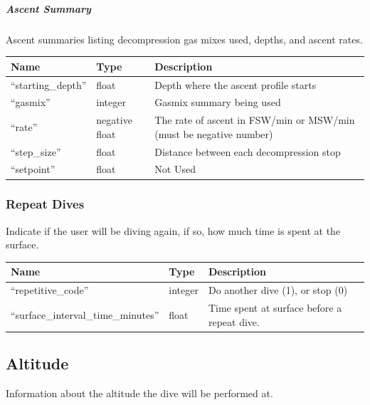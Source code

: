 \documentclass[12pt]{article}
\begin{document}
\subparagraph{Ascent Summary}
Ascent summaries listing decompression gas mixes used, depths, and ascent rates.

\begin{longtable}{|l|l|p{5cm}|}
\hline
 Name                 &  Type            &  Description                                                         \\
\hline
 ``starting\_depth''  &  float           &  Depth where the ascent profile starts                               \\
\hline
 ``gasmix''           &  integer         &  Gasmix summary being used                                           \\
\hline
 ``rate''             &  negative float  &  The rate of ascent in FSW/min or MSW/min (must be negative number)  \\
\hline
 ``step\_size''       &  float           &  Distance between each decompression stop                            \\
\hline
 ``setpoint''         &  float           &  Not Used                                                             \\
\hline
\end{longtable}

\subsubsection{Repeat Dives}
Indicate if the user will be diving again, if so, how much time is spent at the surface.

\begin{longtable}{|l|l|p{5cm}|}

\hline
 Name                                   &  Type    &  Description \\                                                         \hline
 ``repetitive\_code''                  &  integer  &  Do another dive (1), or stop (0)             \\
\hline
 ``surface\_interval\_time\_minutes''  &  float    &  Time spent at surface before a repeat dive.  \\
\hline
\end{longtable}

\subsection{Altitude}
Information about the altitude the dive will be performed at.
\end{document}
